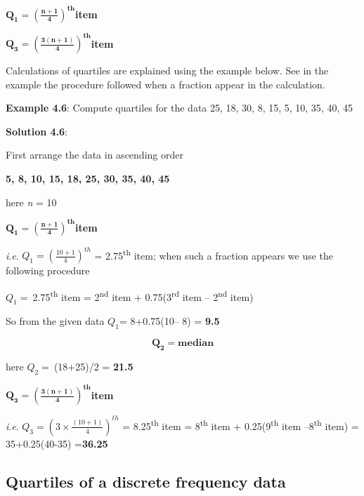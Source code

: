 \documentclass[
]{book}
\begin{document}
\(\mathbf{Q}_{\mathbf{1}}\mathbf{=}\left( \frac{\mathbf{n + 1}}{\mathbf{4}} \right)^{\mathbf{\text{th}}}\)\textbf{item}

\(\mathbf{Q}_{\mathbf{3}}\mathbf{=}\left( \frac{\mathbf{3(n + 1)}}{\mathbf{4}} \right)^{\mathbf{\text{th}}}\)\textbf{item}

Calculations of quartiles are explained using the example below. See in
the example the procedure followed when a fraction appear in the
calculation.

\textbf{Example 4.6}: Compute quartiles for the data 25, 18, 30, 8, 15, 5,
10, 35, 40, 45

\textbf{Solution 4.6}:

First arrange the data in ascending order

\textbf{5, 8, 10, 15, 18, 25, 30, 35, 40, 45}

here \emph{n} = 10

\(\mathbf{Q}_{\mathbf{1}}\mathbf{=}\left( \frac{\mathbf{n + 1}}{\mathbf{4}} \right)^{\mathbf{\text{th}}}\)\textbf{item}

\emph{i}.\emph{e}. \(Q_{1} = \left( \frac{10 + 1}{4} \right)^{th}\) = 2.75\textsuperscript{th} item;
when such a fraction appears we use the following procedure

\(Q_{1} = \ \)2.75\textsuperscript{th} item = 2\textsuperscript{nd} item + 0.75(3\textsuperscript{rd}
item -- 2\textsuperscript{nd} item)

So from the given data \(Q_{1}\)= 8+0.75(10-- 8) = \textbf{9.5}

\[\mathbf{Q}_{\mathbf{2}}\mathbf{= median}\]

here \(Q_{2} = \ \)(18+25)/2 = \textbf{21.5}

\(\mathbf{Q}_{\mathbf{3}}\mathbf{=}\left( \frac{\mathbf{3(n + 1)}}{\mathbf{4}} \right)^{\mathbf{\text{th}}}\)\textbf{item}

\emph{i}.\emph{e}. \(Q_{3} = \left( 3 \times \frac{(10 + 1)}{4} \right)^{th}\) =
8.25\textsuperscript{th} item = 8\textsuperscript{th} item + 0.25(9\textsuperscript{th} item --8\textsuperscript{th} item) =
35+0.25(40-35) =\textbf{36.25}

\hypertarget{quartiles-of-a-discrete-frequency-data}{%
\subsection{Quartiles of a discrete frequency data}\label{quartiles-of-a-discrete-frequency-data}}
\end{document}
